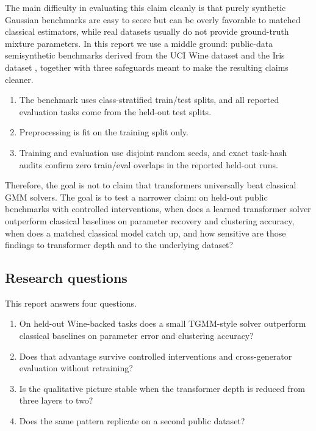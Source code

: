 \documentclass{article}
\newcommand{\tgmm}{\textsc{TGMM}}
\begin{document}
The main difficulty in evaluating this claim cleanly is that purely synthetic Gaussian benchmarks are easy to score but can be overly favorable to matched classical estimators, while real datasets usually do not provide ground-truth mixture parameters. In this report we use a middle ground: public-data semisynthetic benchmarks derived from the UCI Wine dataset \citep{aeberhard1992wine} and the Iris dataset \citep{fisher1936iris}, together with three safeguards meant to make the resulting claims cleaner.

\begin{enumerate}[leftmargin=1.4em]
    \item The benchmark uses class-stratified train/test splits, and all reported evaluation tasks come from the held-out test splits.
    \item Preprocessing is fit on the training split only.
    \item Training and evaluation use disjoint random seeds, and exact task-hash audits confirm zero train/eval overlaps in the reported held-out runs.
\end{enumerate}

Therefore, the goal is not to claim that transformers universally beat classical GMM solvers. The goal is to test a narrower claim: on held-out public benchmarks with controlled interventions, when does a learned transformer solver outperform classical baselines on parameter recovery and clustering accuracy, when does a matched classical model catch up, and how sensitive are those findings to transformer depth and to the underlying dataset?

\subsection{Research questions}
This report answers four questions.
\begin{enumerate}[leftmargin=1.4em]
    \item On held-out Wine-backed tasks does a small \tgmm-style solver outperform classical baselines on parameter error and clustering accuracy?
    \item Does that advantage survive controlled interventions and cross-generator evaluation without retraining?
    \item Is the qualitative picture stable when the transformer depth is reduced from three layers to two?
    \item Does the same pattern replicate on a second public dataset?
\end{enumerate}
\end{document}
